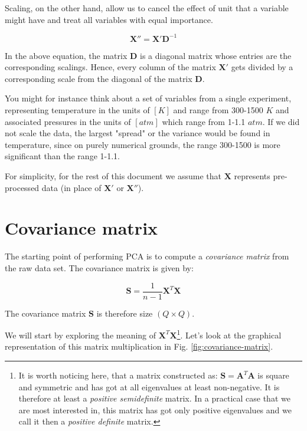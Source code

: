 \documentclass[10pt,twocolumn]{article}
\begin{document}
Scaling, on the other hand, allow us to cancel the effect of unit that a variable might have and treat all variables with equal importance. 

\begin{equation}
\bm{X''} = \bm{X'}\bm{D}^{-1}
\end{equation}

In the above equation, the matrix $\bm{D}$ is a diagonal matrix whose entries are the corresponding scalings. Hence, every column of the matrix $\bm{X'}$ gets divided by a corresponding scale from the diagonal of the matrix $\bm{D}$.

You might for instance think about a set of variables from a single experiment, representing temperature in the units of $[K]$ and range from 300-1500 $K$ and associated pressures in the units of $[atm]$ which range from 1-1.1 $atm$. If we did not scale the data, the largest "spread" or the variance would be found in temperature, since on purely numerical  grounds, the range 300-1500 is more significant than the range 1-1.1.

For simplicity, for the rest of this document we assume that $\bm{X}$ represents pre-processed data (in place of $\bm{X'}$ or $\bm{X''}$).

\section{Covariance matrix}

The starting point of performing PCA is to compute a \textit{covariance matrix} from the raw data set. The covariance matrix is given by:

\begin{equation}
\bm{S} = \frac{1}{n-1} \bm{X}^T \bm{X}
\end{equation}

The covariance matrix $\bm{S}$ is therefore size $(Q \times Q)$.

We will start by exploring the meaning of $\bm{X}^T \bm{X}$\footnote{It is worth noticing here, that a matrix constructed as: $\bm{S} = \bm{A}^T \bm{A}$ is square and symmetric and has got at all eigenvalues at least non-negative. It is therefore at least a \textit{positive semidefinite} matrix. In a practical case that we are most interested in, this matrix has got only positive eigenvalues and we call it then a \textit{positive definite} matrix.}. Let's look at the graphical representation of this matrix multiplication in Fig. \ref{fig:covariance-matrix}.
\end{document}
